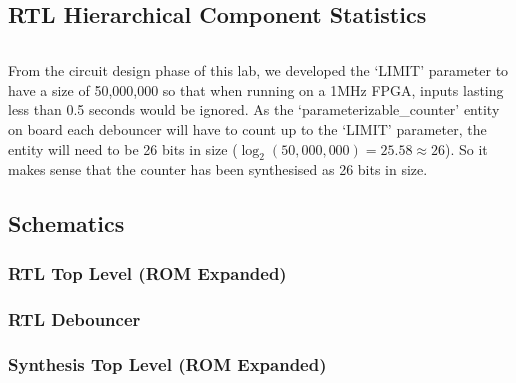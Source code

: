 \documentclass[11pt]{report}
\begin{document}
\subsection*{RTL Hierarchical Component Statistics}
\inputminted[firstline=83,lastline=107]{text}{../../Lab1/Lab1.runs/synth_1/fibonacci_8bit_sequence.vds}

From the circuit design phase of this lab, we developed the `LIMIT' parameter to have a size of 50,000,000 so that when running on a 1MHz FPGA, inputs lasting less than 0.5 seconds would be ignored. As the `parameterizable\_counter' entity on board each debouncer will have to count up to the `LIMIT' parameter, the entity will need to be 26 bits in size ($\log_2(50,000,000)=25.58\approx26$). So it makes sense that the counter has been synthesised as 26 bits in size.



\subsection*{Schematics}

\subsubsection*{RTL Top Level (ROM Expanded)}

\subsubsection*{RTL Debouncer}

\subsubsection*{Synthesis Top Level (ROM Expanded)}
\end{document}
